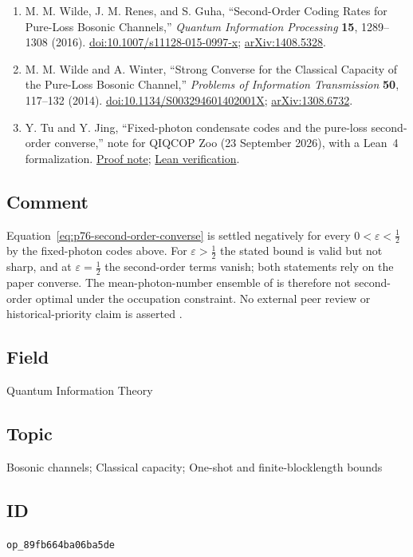 \begin{enumerate}[label={},leftmargin=4.8em,labelsep=0.5em]
  \footnotesize
  \item[\textup{[WRG16]}]\label{ref:p76-wilde-renes-guha}
  M. M. Wilde, J. M. Renes, and S. Guha, ``Second-Order Coding Rates for
  Pure-Loss Bosonic Channels,'' \emph{Quantum Information Processing}
  \textbf{15}, 1289--1308 (2016).
  \href{https://doi.org/10.1007/s11128-015-0997-x}{doi:10.1007/s11128-015-0997-x};
  \href{https://arxiv.org/abs/1408.5328}{arXiv:1408.5328}.

  \item[\textup{[WW14]}]\label{ref:p76-wilde-winter}
  M. M. Wilde and A. Winter, ``Strong Converse for the Classical Capacity of
  the Pure-Loss Bosonic Channel,'' \emph{Problems of Information
  Transmission} \textbf{50}, 117--132 (2014).
  \href{https://doi.org/10.1134/S003294601402001X}{doi:10.1134/S003294601402001X};
  \href{https://arxiv.org/abs/1308.6732}{arXiv:1308.6732}.

  \item[\textup{[TJ26]}]\label{ref:p76-tu-jing}
  Y. Tu and Y. Jing, ``Fixed-photon condensate codes and the pure-loss
second-order converse,'' note for QIQCOP Zoo (23 September 2026), with a
Lean~4 formalization.
\href{https://github.com/Naixu-Guo/quantum-open-problems/blob/main/database/proofs/pure-loss-second-order.md}{Proof note};
\href{https://github.com/Ivann1242/pure-loss-second-order-lean}{Lean verification}.
\end{enumerate}

\subsection*{Comment}

Equation~\eqref{eq:p76-second-order-converse} is settled negatively for every
$0<\varepsilon<\tfrac12$ by the fixed-photon codes above.  For
$\varepsilon>\tfrac12$ the stated bound is valid but not sharp, and at
$\varepsilon=\tfrac12$ the second-order terms vanish; both statements rely on
the paper converse.  The mean-photon-number ensemble of
 is therefore not second-order
optimal under the occupation constraint.  No external peer review or
historical-priority claim is asserted
.

\subsection*{Field}

Quantum Information Theory

\subsection*{Topic}

Bosonic channels; Classical capacity; One-shot and finite-blocklength bounds

\subsection*{ID}

\texttt{op\_89fb664ba06ba5de}
